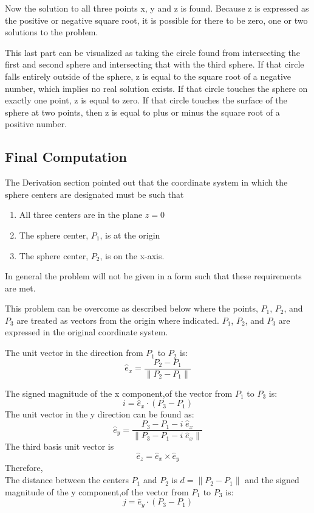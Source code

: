 Now the solution to all three points x, y and z is found. Because z is expressed as the positive or negative square root, it is possible for there to be zero, one or two solutions to the problem.

This last part can be visualized as taking the circle found from intersecting the first and second sphere and intersecting that with the third sphere. If that circle falls entirely outside of the sphere, z is equal to the square root of a negative number, which implies no real solution exists. If that circle touches the sphere on exactly one point, z is equal to zero. If that circle touches the surface of the sphere at two points, then z is equal to plus or minus the square root of a positive number.

\subsection{Final Computation}

The Derivation section pointed out that the coordinate system in which the sphere centers are designated must be such that
\begin{enumerate}
	\item All three centers are in the plane $z=0$
	\item The sphere center, $P_1$, is at the origin
	\item The sphere center, $P_2$, is on the x-axis.
\end{enumerate}
In general the problem will not be given in a form such that these requirements are met.

This problem can be overcome as described below where the points, $P_1$, $P_2$, and $P_3$ are treated as vectors from the origin where indicated. $P_1$, $P_2$, and $P_3$ are expressed in the original coordinate system.

The unit vector in the direction from $P_1$ to $P_2$ is:
\begin{equation}
\hat e_x = \frac{ P_2 - P_1 }{ \| P_2 - P_1 \| } \nonumber
\end{equation}

The signed magnitude of the x component,of the vector from $P_1$ to $P_3$ is:
\begin{equation}
i = \hat e_x \cdot ( P_3 - P_1 )  \nonumber
\end{equation}
The unit vector in the y direction can be found as:
\begin{equation}
\hat e_y = \frac{ P_3 - P_1 - i \; \hat e_x}{ \| P_3 - P_1 - i \; \hat e_x \| } \nonumber
\end{equation}
The third basis unit vector is 
\begin{equation}
\hat e_z = \hat e_x \times \hat e_y \nonumber
\end{equation}
Therefore, \\
The distance between the centers $P_1$ and $P_2$ is $d = \| P_2 - P_1 \|$  and the signed magnitude of the y component,of the vector from $P_1$ to $P_3$ is:
\begin{equation}
j = \hat e_y \cdot ( P_3 - P_1 ) \nonumber
\end{equation}


